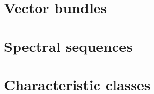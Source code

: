\documentclass[10pt,a5paper]{memoir}
\begin{document}
\chapter{Vector bundles}









\chapter{Spectral sequences}











\chapter{Characteristic classes}






\backmatter

\nocite{*}


\end{document}
